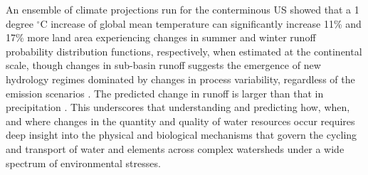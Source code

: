 \documentclass[preprint,review, 12pt]{elsarticle}
\begin{document}
An ensemble of climate projections run for the conterminous US showed that a 1 degree $^\circ$C increase of global mean temperature can significantly increase 11\% and 17\% more land area experiencing changes in summer and winter runoff probability distribution functions, respectively, when estimated at the continental scale, though changes in sub-basin runoff suggests the emergence of new hydrology regimes dominated by changes in process variability, regardless of the emission scenarios \citep{Leng2016c}. The predicted change in runoff is larger than that in precipitation \citep{Leng2016c}. This underscores that understanding and predicting how, when, and where changes in the quantity and quality of water resources occur requires deep insight into the physical and biological mechanisms that govern the cycling and transport of water and elements across complex watersheds under a wide spectrum of environmental stresses.
\end{document}
